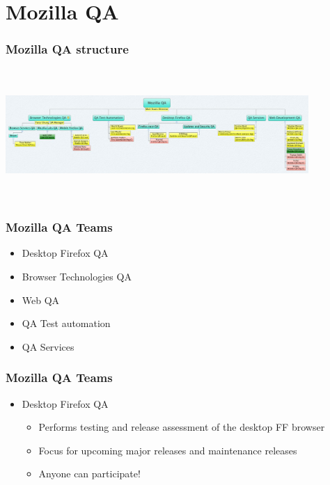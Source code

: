 \documentclass{beamer}
\begin{document}
\section{Mozilla QA}

\begin{frame}
\frametitle{Mozilla QA structure}
\begin{center}
 \includegraphics[height=5cm,width=11.5cm]{figs/MozillaQAOrgPic.jpg}
\begin{figure}
\end{figure}
\end{center}
\end{frame}


\begin{frame}
\frametitle{Mozilla QA Teams}
 \begin{itemize}
 \item Desktop Firefox QA
 \item Browser Technologies QA
 \item Web QA
 \item QA Test automation
 \item QA Services
 \end{itemize}
\end{frame}


\begin{frame}
\frametitle{Mozilla QA Teams}
 \begin{itemize}
 \item Desktop Firefox QA
      \begin{itemize}
      \item Performs testing and release assessment of the desktop FF browser
      \item Focus for upcoming major releases and maintenance releases
      \item Anyone can participate!
      \end{itemize}
 \end{itemize}
\end{frame}
\end{document}
